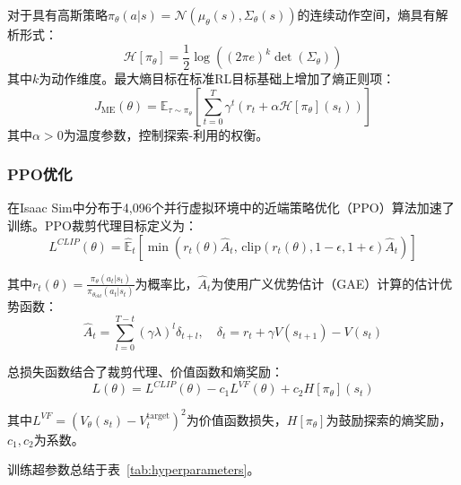 对于具有高斯策略$\pi_\theta(a|s) = \mathcal{N}(\mu_\theta(s), \Sigma_\theta(s))$的连续动作空间，熵具有解析形式：
\begin{equation}
    \mathcal{H}[\pi_\theta] = \frac{1}{2} \log \left( (2\pi e)^k \det(\Sigma_\theta) \right)
\end{equation}
其中$k$为动作维度。最大熵目标在标准RL目标基础上增加了熵正则项：
\begin{equation}
    J_{\text{ME}}(\theta) = \mathbb{E}_{\tau \sim \pi_\theta} \left[ \sum_{t=0}^{T} \gamma^t \left( r_t + \alpha \mathcal{H}[\pi_\theta](s_t) \right) \right]
\end{equation}
其中$\alpha > 0$为温度参数，控制探索-利用的权衡。

\subsubsection{PPO优化}
\label{subsec:ppo}

在Isaac Sim中分布于4,096个并行虚拟环境中的近端策略优化（PPO）算法加速了训练。PPO裁剪代理目标定义为：
\begin{equation}
    L^{CLIP}(\theta) = \hat{\mathbb{E}}_t \left[ \min \left( r_t(\theta) \hat{A}_t, \, \text{clip}(r_t(\theta), 1-\epsilon, 1+\epsilon) \hat{A}_t \right) \right]
\end{equation}

其中$r_t(\theta) = \frac{\pi_\theta(a_t|s_t)}{\pi_{\theta_{old}}(a_t|s_t)}$为概率比，$\hat{A}_t$为使用广义优势估计（GAE）计算的估计优势函数：
\begin{equation}
    \hat{A}_t = \sum_{l=0}^{T-t} (\gamma \lambda)^l \delta_{t+l}, \quad \delta_t = r_t + \gamma V(s_{t+1}) - V(s_t)
\end{equation}

总损失函数结合了裁剪代理、价值函数和熵奖励：
\begin{equation}
    L(\theta) = L^{CLIP}(\theta) - c_1 L^{VF}(\theta) + c_2 H[\pi_\theta](s_t)
\end{equation}

其中$L^{VF} = (V_\theta(s_t) - V_t^{\text{target}})^2$为价值函数损失，$H[\pi_\theta]$为鼓励探索的熵奖励，$c_1, c_2$为系数。

训练超参数总结于表~\ref{tab:hyperparameters}。

